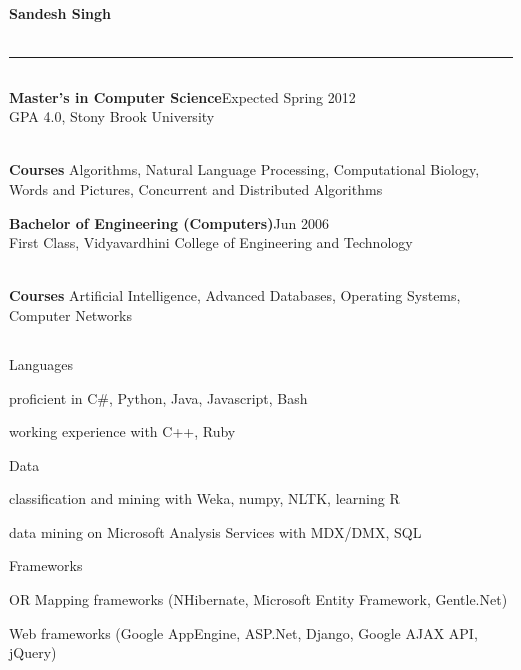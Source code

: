 \documentclass[a4paper,11pt,final]{article}
\newcommand{\resumetitle}[1]{%
  \subsection*{%
    \Large\sc{\textbf{#1}}%
  }%
  
}%
\newcommand{\eduexp}[3]{%
\noindent\textbf{#1}\hfill{#2}\normalsize\\{#3}\vspace{3pt}%
}
\newcommand{\resumedescheader}[1]{%
  \bigskip
  \resumetitle{#1}
}%
\newenvironment{resumedescription}{%
  \begin{basedescript}{\desclabelstyle{\multilinelabel}\desclabelwidth{0.15\linewidth}}{%
      \renewcommand{\makelabel}[1]{{##1}}%
    }%
      \setlength{\itemsep}{0pt}
}{%
  \end{basedescript}%
}
\begin{document}
\pagestyle{empty}

\begin{center}
  \centering\Large\textbf{Sandesh Singh}\normalsize \\
   \\
  \rule[2pt]{0.99\linewidth}{.1pt}
\end{center}

\vspace{-20pt}
\resumedescheader{Education}
\eduexp
	{Master's in Computer Science}
	{Expected Spring 2012}
	{GPA 4.0, Stony Brook University}
\\ \noindent \textbf{Courses} Algorithms, Natural Language Processing, Computational Biology, Words and Pictures, Concurrent and Distributed Algorithms
\\
\vspace{-5pt}

\eduexp
	{Bachelor of Engineering (Computers)}
	{Jun 2006}
	{First Class, Vidyavardhini College of Engineering and Technology}
\\ \noindent \textbf{Courses} Artificial Intelligence, Advanced Databases, Operating Systems, Computer Networks

\resumedescheader{Skills}
\begin{resumedescription}
\item [Languages]
\begin{itemize*}
  \item proficient in C\#, Python, Java, Javascript, Bash
  \item working experience with C++, Ruby
\end{itemize*}

\item [Data] 
\begin{itemize*}
  \item classification and mining with Weka, numpy, NLTK, learning R
  \item data mining on Microsoft Analysis Services with MDX/DMX, SQL
\end{itemize*}

\item [Frameworks]
\begin{itemize*}
  \item OR Mapping frameworks (NHibernate, Microsoft Entity Framework, Gentle.Net)
  \item Web frameworks (Google AppEngine, ASP.Net, Django, Google AJAX API, jQuery)
\end{itemize*}

\end{resumedescription}
\end{document}
